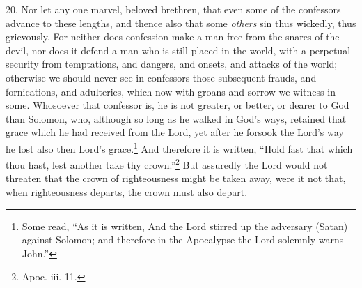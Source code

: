 20. Nor let any one marvel, beloved brethren, that even some of the confessors advance to these lengths, and thence also that some \emph{others} sin thus wickedly, thus grievously. For neither does confession make a man free from the snares of the devil, nor does it defend a man who is still placed in the world, with a perpetual security from temptations, and dangers, and onsets, and attacks of the world; otherwise we should never see in confessors those subsequent frauds, and fornications, and adulteries, which now with groans and sorrow we witness in some. Whosoever that confessor is, he is not greater, or better, or dearer to God than Solomon, who, although so long as he walked in God’s ways, retained that grace which he had received from the Lord, yet after he forsook the Lord’s way he lost also then Lord’s grace.\footnote{Some read, “As it is written, And the Lord stirred up the adversary (Satan) against Solomon; and therefore in the Apocalypse the Lord solemnly warns John.”} And therefore it is written, “Hold fast that which thou hast, lest another take thy crown.”\footnote{Apoc. iii. 11.} But assuredly the Lord would not threaten that the crown of righteousness might be taken away, were it not that, when righteousness departs, the crown must also depart.

